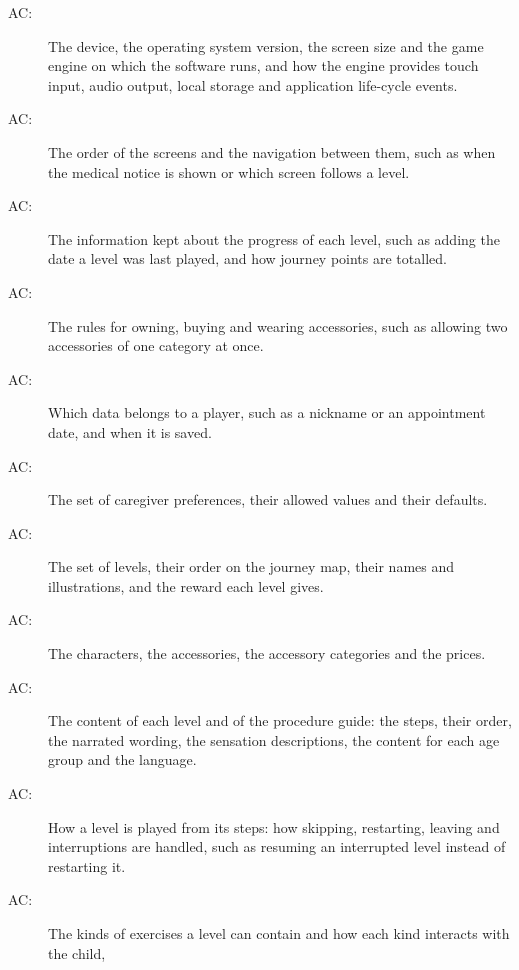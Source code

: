 \documentclass[12pt, titlepage]{article}
\newcounter{acnum}
\newcommand{\actheacnum}{AC\theacnum}
\begin{document}
\begin{description}
\item[ \actheacnum \label{acHardware}:] The device, the
  operating system version, the screen size and the game engine on which the
  software runs, and how the engine provides touch input, audio output, local
  storage and application life-cycle events.
\item[ \actheacnum \label{acControl}:] The order of the
  screens and the navigation between them, such as when the medical notice is
  shown or which screen follows a level.
\item[ \actheacnum \label{acProgress}:] The information
  kept about the progress of each level, such as adding the date a level was
  last played, and how journey points are totalled.
\item[ \actheacnum \label{acWardrobe}:] The rules for
  owning, buying and wearing accessories, such as allowing two accessories of
  one category at once.
\item[ \actheacnum \label{acPlayerData}:] Which data
  belongs to a player, such as a nickname or an appointment date, and when it
  is saved.
\item[ \actheacnum \label{acPrefs}:] The set of caregiver
  preferences, their allowed values and their defaults.
\item[ \actheacnum \label{acLevels}:] The set of levels,
  their order on the journey map, their names and illustrations, and the
  reward each level gives.
\item[ \actheacnum \label{acAccessories}:] The
  characters, the accessories, the accessory categories and the prices.
\item[ \actheacnum \label{acContent}:] The content of
  each level and of the procedure guide: the steps, their order, the narrated
  wording, the sensation descriptions, the content for each age group and the
  language.
\item[ \actheacnum \label{acRunner}:] How a level is
  played from its steps: how skipping, restarting, leaving and interruptions
  are handled, such as resuming an interrupted level instead of restarting it.
\item[ \actheacnum \label{acSteps}:] The kinds of
  exercises a level can contain and how each kind interacts with the child,

\end{description}
\end{document}

